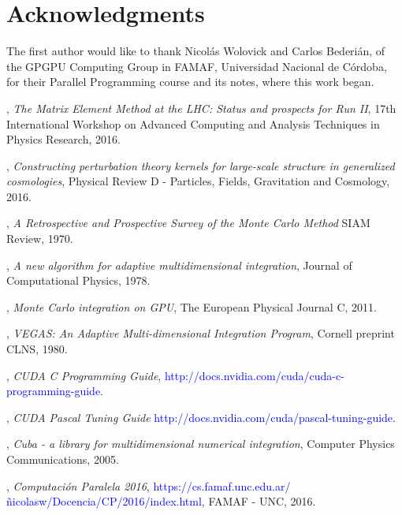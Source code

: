 \documentclass[english]{maciarticle}
\begin{document}
\section*{Acknowledgments}
The first author would like to thank Nicol\'as Wolovick and Carlos Bederi\'an, of the
GPGPU Computing Group in FAMAF, Universidad Nacional de C\'ordoba, for their Parallel Programming course and its notes\cite{cp2016}, where this work began.


\begin{thebibliography}{1}
 {},
\emph{The Matrix Element Method at the LHC: Status and prospects for Run II},
17th International Workshop on Advanced Computing and Analysis Techniques in Physics Research, 2016.

 {},
\emph{Constructing perturbation theory kernels for large-scale structure in generalized cosmologies},
Physical Review D - Particles, Fields, Gravitation and Cosmology, 2016.

 {},
\emph{A Retrospective and Prospective Survey of the Monte Carlo Method}
SIAM Review, 1970.

 {},
\emph{A new algorithm for adaptive multidimensional integration},
Journal of Computational Physics, 1978.

 {},
{\em Monte Carlo integration on GPU},
The European Physical Journal C, 2011.

 {},
{\em VEGAS: An Adaptive Multi-dimensional Integration Program},
Cornell preprint CLNS, 1980.

 {}, {\em CUDA C Programming Guide},
\textcolor{blue}{http://docs.nvidia.com/cuda/cuda-c-programming-guide}.

 {}, {\em CUDA Pascal Tuning Guide} \textcolor{blue}{http://docs.nvidia.com/cuda/pascal-tuning-guide}.

 {},
\emph{Cuba - a library for multidimensional numerical integration},
Computer Physics Communications, 2005.

 {},
{\em Computaci\'on Paralela 2016}, \textcolor{blue}{https://cs.famaf.unc.edu.ar/\~nicolasw/Docencia/CP/2016/index.html},
FAMAF - UNC, 2016.
\end{thebibliography}
\end{document}

